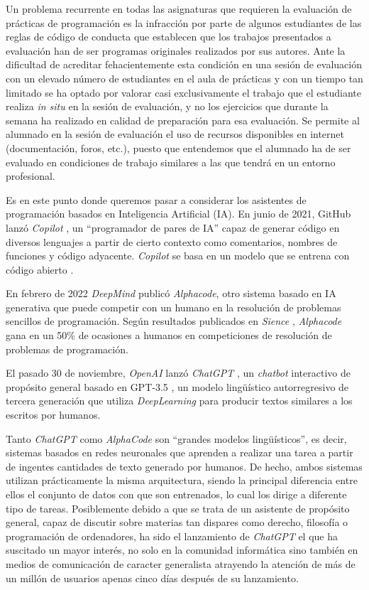 \documentclass[twocolumn,twoside,a4paper, 10pt]{article}
\newcommand{\ChatGPT}{\textit{ChatGPT}{}}           %
\begin{document}
Un problema recurrente en todas las asignaturas que requieren la evaluación de prácticas de programación es la
infracción por parte de algunos estudiantes de las reglas de código de conducta que establecen que los
trabajos presentados a evaluación han de ser programas originales realizados por sus autores.
Ante la dificultad de acreditar fehacientemente esta condición en una sesión de evaluación con un elevado
número de estudiantes en el aula de prácticas y con un tiempo tan limitado se ha optado por valorar
casi exclusivamente el trabajo que el estudiante realiza \textit{in situ} en la sesión de evaluación, y no los
ejercicios que durante la semana ha realizado en calidad de preparación para esa evaluación.
Se permite al alumnado en la sesión de evaluación el uso de recursos disponibles en internet (documentación,
foros, etc.), puesto que entendemos que el alumnado ha de ser evaluado en condiciones de trabajo similares a 
las que tendrá en un entorno profesional.

Es en este punto donde queremos pasar a considerar los asistentes de programación basados en Inteligencia Artificial (IA).
En junio de 2021, GitHub lanzó \textit{Copilot} 
\cite{Nguyen:2022:AnEE},
un ``programador de pares de IA'' capaz de generar
código en diversos lenguajes a partir de cierto contexto como comentarios, nombres de funciones y código adyacente. 
\textit{Copilot} se basa en un modelo que se entrena con código abierto \cite{Chen:2021:ELL}.

En febrero de 2022 \textit{DeepMind} publicó \textit{Alphacode}, otro sistema basado en IA
generativa que puede competir con un humano en la resolución de problemas sencillos de programación.
Según resultados publicados en \textit{Sience} \cite{Li:2022:CCG}, \textit{Alphacode} gana en un 50\%
de ocasiones a humanos en competiciones de resolución de problemas de programación.

El pasado 30 de noviembre, \textit{OpenAI} lanzó \ChatGPT{}
\cite{Zhang:2020:chatgpt}, 
un \textit{chatbot} interactivo de propósito general basado en GPT-3.5
\cite{Floridi:2020:GPT-3},
un modelo lingüístico autorregresivo de tercera generación que utiliza \textit{DeepLearning} para producir textos 
similares a los escritos por humanos.

Tanto \ChatGPT{} como \textit{AlphaCode} son ``grandes modelos lingüísticos'', es decir, sistemas basados en 
redes neuronales que aprenden a realizar una tarea a partir de ingentes cantidades de texto generado por humanos. 
De hecho, ambos sistemas utilizan prácticamente la misma arquitectura, siendo la principal diferencia entre
ellos el conjunto de datos con que son entrenados, lo cual los dirige a diferente tipo de tareas.
Posiblemente debido a que se trata de un asistente de propósito general, capaz de discutir sobre materias tan dispares 
como derecho, filosofía o programación de ordenadores, ha sido el lanzamiento de \ChatGPT{} el que ha suscitado un mayor
interés, no solo en la comunidad informática sino también en medios de comunicación de caracter generalista
\cite{Perez:2022:FBM} 
atrayendo la atención de más de un millón de usuarios apenas cinco días después de su lanzamiento.
\end{document}
